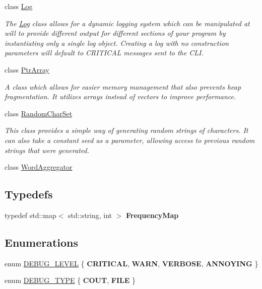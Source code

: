 \begin{DoxyCompactItemize}
class \hyperlink{classTurnLeft_1_1Utils_1_1Log}{Log}
\begin{DoxyCompactList}\small\item\em The \hyperlink{classTurnLeft_1_1Utils_1_1Log}{Log} class allows for a dynamic logging system which can be manipulated at will to provide different output for different sections of your program by instantiating only a single log object. Creating a log with no construction parameters will default to CRITICAL messages sent to the CLI. \item\end{DoxyCompactList}\item 
class \hyperlink{classTurnLeft_1_1Utils_1_1PtrArray}{PtrArray}
\begin{DoxyCompactList}\small\item\em A class which allows for easier memory management that also prevents heap fragmentation. It utilizes arrays instead of vectors to improve performance. \item\end{DoxyCompactList}\item 
class \hyperlink{classTurnLeft_1_1Utils_1_1RandomCharSet}{RandomCharSet}
\begin{DoxyCompactList}\small\item\em This class provides a simple way of generating random strings of characters. It can also take a constant seed as a parameter, allowing access to previous random strings that were generated. \item\end{DoxyCompactList}\item 
class \hyperlink{classTurnLeft_1_1Utils_1_1WordAggregator}{WordAggregator}
\end{DoxyCompactItemize}
\subsection*{Typedefs}
\begin{DoxyCompactItemize}
\item 
\hypertarget{namespaceTurnLeft_1_1Utils_a25c509095b780d24d7ce75b2ee309ca0}{
typedef std::map$<$ std::string, int $>$ {\bfseries FrequencyMap}}
\label{namespaceTurnLeft_1_1Utils_a25c509095b780d24d7ce75b2ee309ca0}

\end{DoxyCompactItemize}
\subsection*{Enumerations}
\begin{DoxyCompactItemize}
\item 
enum \hyperlink{namespaceTurnLeft_1_1Utils_a55225b27548ba5d55b26a6a5f1ba294e}{DEBUG\_\-LEVEL} \{ {\bfseries CRITICAL}, 
{\bfseries WARN}, 
{\bfseries VERBOSE}, 
{\bfseries ANNOYING}
 \}
\item 
enum \hyperlink{namespaceTurnLeft_1_1Utils_a9d1cba01e5417c6262d11cc154c9a252}{DEBUG\_\-TYPE} \{ {\bfseries COUT}, 
{\bfseries FILE}
 \}
\end{DoxyCompactItemize}


